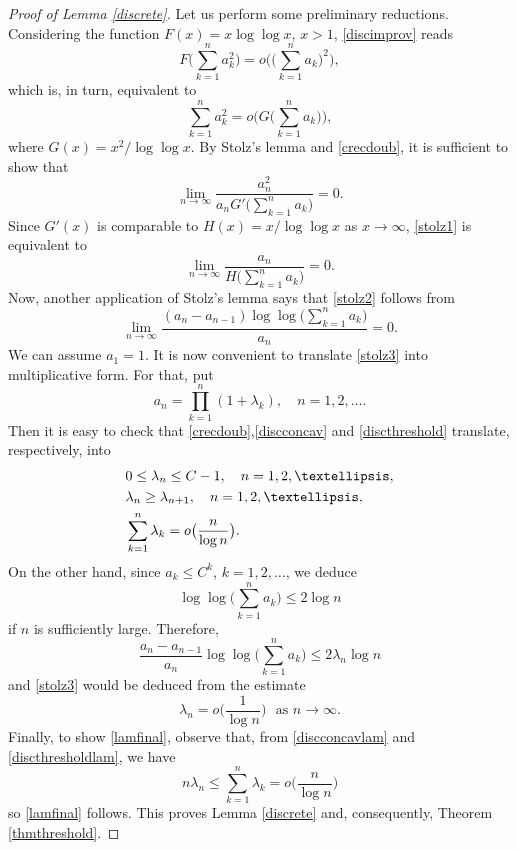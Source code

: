 \documentclass[10pt,a4paper]{amsart}
\begin{document}
\begin{proof}[Proof of Lemma \ref{discrete}] Let us perform some preliminary reductions. Considering the function $F(x) = x \log \log x$, $x>1$,  \eqref{discimprov} reads 
$$
F \big ( \sum_{k=1}^n a_k^2  \big ) = o \Big ( \big ( \sum_{k=1}^n a_k  \big )^2 \Big ) , 
$$
which is, in turn, equivalent to
$$
\sum_{k=1}^n a_k^2  = o \Big ( G \big ( \sum_{k=1}^n a_k  \big ) \Big ) , 
$$
where $\displaystyle G(x) = x^2 / \log \log x$. By Stolz's lemma and \eqref{crecdoub},  it is sufficient to show that
\begin{equation}\label{stolz1}
\lim_{n\to \infty} \frac{a_n^2}{a_n G' \big ( \sum_{k=1}^n a_k  \Big )} = 0 . 
\end{equation}
Since $\displaystyle G'(x)$ is comparable to  $ H(x) = x / \log \log x $ as $x\to \infty$, \eqref{stolz1} is equivalent to
\begin{equation}\label{stolz2}
\lim_{n\to \infty} \frac{a_n}{H \big ( \sum_{k=1}^n a_k \big )} = 0. 
\end{equation}
Now, another application of Stolz's lemma says that \eqref{stolz2} follows from 
\begin{equation}\label{stolz3}
\lim_{n\to \infty} \frac{(a_n - a_{n-1}) \log \log \big (  \sum_{k=1}^n a_k \big )}{a_n} = 0 . 
\end{equation}
We can assume $a_1 = 1$. It is now convenient to translate \eqref{stolz3} into multiplicative form. For that, put
$$
a_n = \prod_{k=1}^n (1 + \lambda_k ), \quad n=1,2,\ldots .
$$
Then it is easy to check that  \eqref{crecdoub},\eqref{discconcav} and \eqref{discthreshold} translate, respectively, into
\begin{eqnarray}
& 0 \leq \lambda_n \leq C - 1 , \quad n=1,2,\ldots ,  \vspace{0.2cm} \label{crecdoublam}\\
& \lambda_n \geq \lambda_{n+1}, \quad n=1,2, \ldots ,  \vspace{0.2cm} \label{discconcavlam}\\
& \displaystyle \sum_{k=1}^n \lambda_k = \displaystyle o\big ( \frac{n}{\log n}  \big ) .  \label{discthresholdlam}
\end{eqnarray}
On the other hand, since $a_k \leq C^k$, $k=1,2,\ldots$, we deduce
$$
\log \log \big ( \sum_{k=1}^n a_k  \big ) \leq 2 \log n
$$
if $n$ is sufficiently large. Therefore,
$$
\frac{a_n - a_{n-1}}{a_n} \log \log \big ( \sum_{k=1}^n a_k  \big ) \leq  2\lambda_n \log n
$$
and \eqref{stolz3} would be deduced from the estimate
\begin{equation}\label{lamfinal}
\lambda_n = o \big (  \frac{1}{\log n}  \big ) \, \, \, \, \text{as} \, \, n \to \infty . 
\end{equation}
Finally, to show \eqref{lamfinal}, observe that, from \eqref{discconcavlam} and \eqref{discthresholdlam}, we have
$$
n \lambda_n \leq \sum_{k=1}^n \lambda_k = o\big ( \frac{n}{\log n}  \big )
$$
so \eqref{lamfinal} follows. This proves Lemma \ref{discrete} and, consequently, Theorem \ref{thmthreshold}.
\end{proof}
\end{document}
